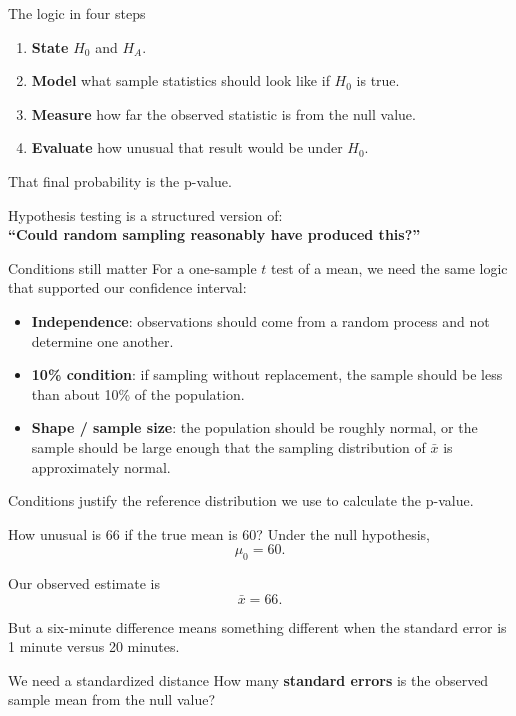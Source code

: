 \documentclass[11pt,aspectratio=169]{beamer}
\begin{document}
\begin{frame}{The logic in four steps}
\begin{enumerate}
  \item \textbf{State} $H_0$ and $H_A$.
  \item \textbf{Model} what sample statistics should look like if $H_0$ is true.
  \item \textbf{Measure} how far the observed statistic is from the null value.
  \item \textbf{Evaluate} how unusual that result would be under $H_0$.
\end{enumerate}

\vspace{1em}
That final probability is the \alert{p-value}.

\vfill
\begin{center}
\large Hypothesis testing is a structured version of:\\
\textbf{``Could random sampling reasonably have produced this?''}
\end{center}
\end{frame}

\begin{frame}{Conditions still matter}
For a one-sample $t$ test of a mean, we need the same logic that supported our confidence interval:

\begin{itemize}
  \item \textbf{Independence}: observations should come from a random process and not determine one another.
  \item \textbf{10\% condition}: if sampling without replacement, the sample should be less than about 10\% of the population.
  \item \textbf{Shape / sample size}: the population should be roughly normal, or the sample should be large enough that the sampling distribution of $\bar{x}$ is approximately normal.
\end{itemize}

\vfill
Conditions justify the reference distribution we use to calculate the p-value.
\end{frame}

\begin{frame}{How unusual is 66 if the true mean is 60?}
Under the null hypothesis,
\[
\mu_0=60.
\]

Our observed estimate is
\[
\bar{x}=66.
\]

But a six-minute difference means something different when the standard error is 1 minute versus 20 minutes.

\vfill
\begin{alertblock}{We need a standardized distance}
How many \textbf{standard errors} is the observed sample mean from the null value?
\end{alertblock}
\end{frame}
\end{document}
